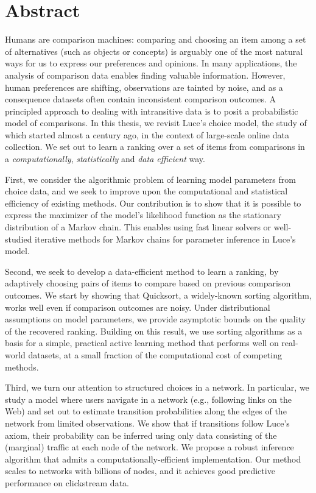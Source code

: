\cleardoublepage
\chapter*{Abstract}

Humans are comparison machines: comparing and choosing an item among a set of alternatives (such as objects or concepts) is arguably one of the most natural ways for us to express our preferences and opinions.
In many applications, the analysis of comparison data enables finding valuable information.
However, human preferences are shifting, observations are tainted by noise, and as a consequence datasets often contain inconsistent comparison outcomes.
A principled approach to dealing with intransitive data is to posit a probabilistic model of comparisons.
In this thesis, we revisit Luce's choice model, the study of which started almost a century ago, in the context of large-scale online data collection.
We set out to learn a ranking over a set of items from comparisons in a \emph{computationally}, \emph{statistically} and \emph{data efficient} way.

First, we consider the algorithmic problem of learning model parameters from choice data, and we seek to improve upon the computational and statistical efficiency of existing methods.
Our contribution is to show that it is possible to express the maximizer of the model's likelihood function as the stationary distribution of a Markov chain.
This enables using fast linear solvers or well-studied iterative methods for Markov chains for parameter inference in Luce's model.

Second, we seek to develop a data-efficient method to learn a ranking, by adaptively choosing pairs of items to compare based on previous comparison outcomes.
We start by showing that Quicksort, a widely-known sorting algorithm, works well even if comparison outcomes are noisy.
Under distributional assumptions on model parameters, we provide asymptotic bounds on the quality of the recovered ranking.
Building on this result, we use sorting algorithms as a basis for a simple, practical active learning method that performs well on real-world datasets, at a small fraction of the computational cost of competing methods.

Third, we turn our attention to structured choices in a network.
In particular, we study a model where users navigate in a network (e.g., following links on the Web) and set out to estimate transition probabilities along the edges of the network from limited observations.
We show that if transitions follow Luce's axiom, their probability can be inferred using only data consisting of the (marginal) traffic at each node of the network.
We propose a robust inference algorithm that admits a computationally-efficient implementation.
Our method scales to networks with billions of nodes, and it achieves good predictive performance on clickstream data.

